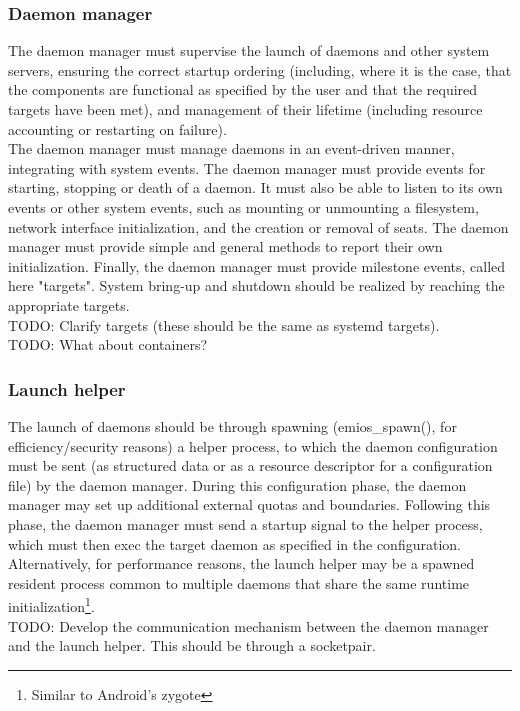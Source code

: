 \subsubsection{Daemon manager}
The daemon manager must supervise the launch of daemons and other system servers, ensuring the correct startup ordering (including, where it is the case, that the components are functional as specified by the user and that the required targets have been met), and management of their lifetime (including resource accounting or restarting on failure).\\
The daemon manager must manage daemons in an event-driven manner, integrating with system events. The daemon manager must provide events for starting, stopping or death of a daemon. It must also be able to listen to its own events or other system events, such as mounting or unmounting a filesystem, network interface initialization, and the creation or removal of seats. The daemon manager must provide simple and general methods to report their own initialization. Finally, the daemon manager must provide milestone events, called here "targets". System bring-up and shutdown should be realized by reaching the appropriate targets.\\
TODO: Clarify targets (these should be the same as systemd targets).\\
TODO: What about containers?
\subsubsection{Launch helper}
The launch of daemons should be through spawning (emios\_spawn(), for efficiency/security reasons) a helper process, to which the daemon configuration must be sent (as structured data or as a resource descriptor for a configuration file) by the daemon manager. During this configuration phase, the daemon manager may set up additional external quotas and boundaries. Following this phase, the daemon manager must send a startup signal to the helper process, which must then exec the target daemon as specified in the configuration.\\
Alternatively, for performance reasons, the launch helper may be a spawned resident process common to multiple daemons that share the same runtime initialization\footnote{Similar to Android's zygote}.\\
TODO: Develop the communication mechanism between the daemon manager and the launch helper. This should be through a socketpair.

